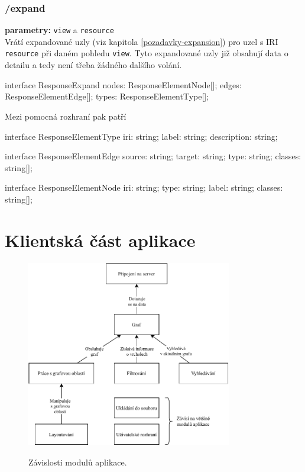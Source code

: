 \subsubsection{/expand}
\textbf{parametry:} \texttt{view} a \texttt{resource} \\
Vrátí expandované uzly (viz kapitola \ref{pozadavky-expansion}) pro uzel s IRI \texttt{resource} při daném pohledu \texttt{view}. Tyto expandované uzly již obsahují data o detailu a tedy není třeba žádného dalšího volání.

\begin{code}
interface ResponseExpand {
    nodes: ResponseElementNode[];
    edges: ResponseElementEdge[];
    types: ResponseElementType[];
}
\end{code}

\newpage

Mezi pomocná rozhraní pak patří
\begin{code}
interface ResponseElementType {
    iri: string;
    label: string;
    description: string;
}

interface ResponseElementEdge {
    source: string;
    target: string;
    type: string;
    classes: string[];
}

interface ResponseElementNode {
    iri: string;
    type: string;
    label: string;
    classes: string[];
}
\end{code}

\newpage

\section{Klientská část aplikace}

\begin{figure}[h]
    \centering
    \includegraphics[width=0.8\textwidth]{media/module-dependencies.pdf}
    \label{fig:module-dependencies}
    \caption{Závislosti modulů aplikace.}
\end{figure}

